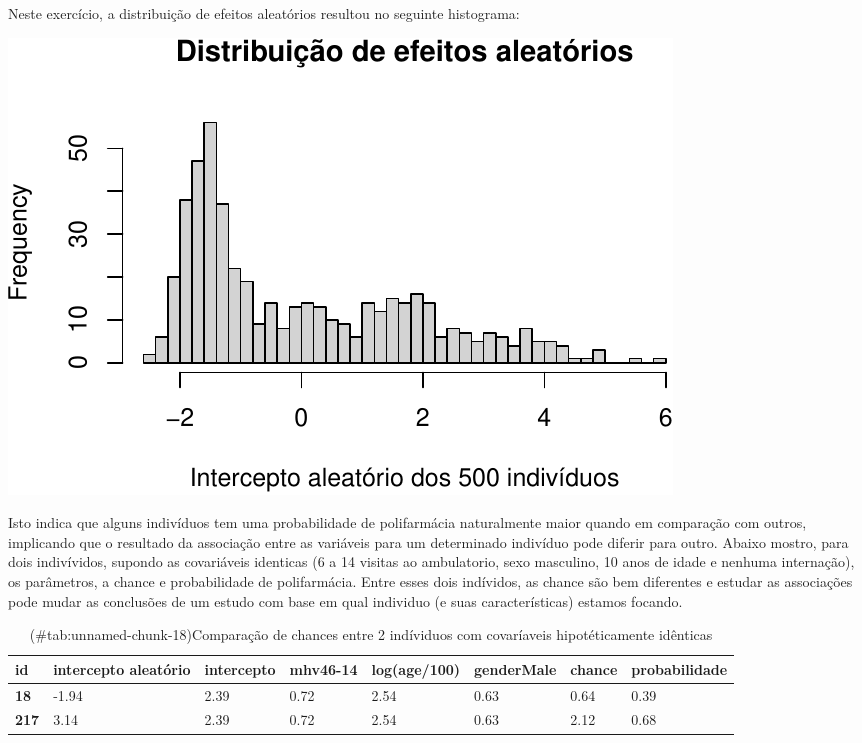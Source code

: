 \documentclass[
  11pt,
]{article}
\begin{document}
Neste exercício, a distribuição de efeitos aleatórios resultou no seguinte histograma:

\begin{center}\includegraphics{lista3_files/figure-latex/unnamed-chunk-17-1} \end{center}

Isto indica que alguns indivíduos tem uma probabilidade de polifarmácia naturalmente maior quando em comparação com outros, implicando que o resultado da associação entre as variáveis para um determinado indivíduo pode diferir para outro. Abaixo mostro, para dois indivívidos, supondo as covariáveis identicas (6 a 14 visitas ao ambulatorio, sexo masculino, 10 anos de idade e nenhuma internação), os parâmetros, a chance e probabilidade de polifarmácia. Entre esses dois indívidos, as chance são bem diferentes e estudar as associações pode mudar as conclusões de um estudo com base em qual individuo (e suas características) estamos focando.

\begin{table}

\caption{(\#tab:unnamed-chunk-18)Comparação de chances entre 2 indíviduos com covaríaveis hipotéticamente idênticas}
\centering
\fontsize{12}{14}\selectfont
\begin{tabular}[t]{>{}llllllll}
\toprule
id & intercepto aleatório & intercepto & mhv46-14 & log(age/100) & genderMale & chance & probabilidade\\
\midrule
\textbf{18} & -1.94 & 2.39 & 0.72 & 2.54 & 0.63 & 0.64 & 0.39\\
\textbf{217} & 3.14 & 2.39 & 0.72 & 2.54 & 0.63 & 2.12 & 0.68\\
\bottomrule
\end{tabular}
\end{table}
\end{document}
